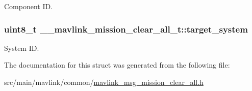 Component I\+D. 

\hypertarget{struct____mavlink__mission__clear__all__t_ad628d39e2e099c3c1c015b15b7d4d150}{
\subsubsection[{target\+\_\+system}]{\setlength{\rightskip}{0pt plus 5cm}uint8\+\_\+t \+\_\+\+\_\+mavlink\+\_\+mission\+\_\+clear\+\_\+all\+\_\+t\+::target\+\_\+system}}\label{struct____mavlink__mission__clear__all__t_ad628d39e2e099c3c1c015b15b7d4d150}


System I\+D. 



The documentation for this struct was generated from the following file\+:\begin{DoxyCompactItemize}
\item 
src/main/mavlink/common/\hyperlink{mavlink__msg__mission__clear__all_8h}{mavlink\+\_\+msg\+\_\+mission\+\_\+clear\+\_\+all.\+h}\end{DoxyCompactItemize}
